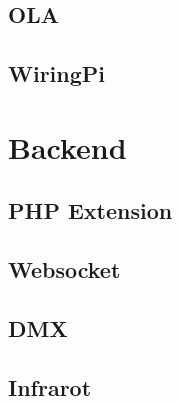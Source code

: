 \documentclass[
    headings=optiontotocandhead,%
    twoside,
    numbers=noenddot,%
    toc=flat, %
    12pt, %
    titlepage, %
    parskip=full, %
    listof=totoc, %
    listof=flat, %
    numbers=noenddot, %
    bibliography=totoc, %
    a4paper,DIV=14,
    BCOR=15mm,
]{scrbook}
\begin{document}


\section{OLA}\label{ola}

\renewcommand{\kapitelautor}{Autor: Clemens Scharwitzl}



\section{WiringPi}\label{WiringPi}

\renewcommand{\kapitelautor}{Autor: Clemens Scharwitzl}



\chapter{Backend}\label{Backend}

\section{PHP Extension}\label{PHP-Extension}

\renewcommand{\kapitelautor}{Autor: Clemens Scharwitzl}



\section{Websocket}\label{Websocket}

\renewcommand{\kapitelautor}{Autor: Dominik Nußbaumer}

    

\section{DMX}\label{DMX}

\renewcommand{\kapitelautor}{Autor: Clemens Scharwitzl}



\section{Infrarot}\label{Infrarot}
\end{document}
